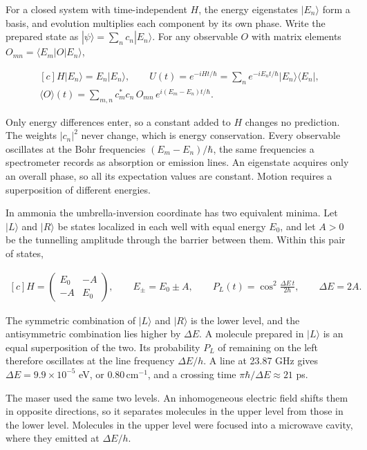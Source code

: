 \documentclass[11pt,oneside]{book}
\newenvironment{centeredalign}{\[\begin{gathered}[c]}{\end{gathered}\]}
\begin{document}
For a closed system with time-independent \(H\), the energy eigenstates \(|E_n\rangle\) form a basis, and evolution multiplies each component by its own phase. Write the prepared state as \(|\psi\rangle=\sum_nc_n|E_n\rangle\). For any observable \(O\) with matrix elements \(O_{mn}=\langle E_m|O|E_n\rangle\),

\begin{centeredalign}
H|E_n\rangle=E_n|E_n\rangle,\qquad
U(t)=e^{-iHt/\hbar}=\sum_ne^{-iE_nt/\hbar}|E_n\rangle\langle E_n|,\\
\langle O\rangle(t)=\sum_{m,n}c_m^*c_n\,O_{mn}\,e^{i(E_m-E_n)t/\hbar}.
\end{centeredalign}

Only energy differences enter, so a constant added to \(H\) changes no prediction. The weights \(|c_n|^2\) never change, which is energy conservation. Every observable oscillates at the Bohr frequencies \((E_m-E_n)/\hbar\), the same frequencies a spectrometer records as absorption or emission lines. An eigenstate acquires only an overall phase, so all its expectation values are constant. Motion requires a superposition of different energies.

In ammonia the umbrella-inversion coordinate has two equivalent minima. Let \(|L\rangle\) and \(|R\rangle\) be states localized in each well with equal energy \(E_0\), and let \(A>0\) be the tunnelling amplitude through the barrier between them. Within this pair of states,

\begin{centeredalign}
H=\begin{pmatrix}E_0&-A\\-A&E_0\end{pmatrix},\qquad E_\pm=E_0\pm A,\qquad
P_L(t)=\cos^2\frac{\Delta E\,t}{2\hbar},\qquad \Delta E=2A.
\end{centeredalign}

The symmetric combination of \(|L\rangle\) and \(|R\rangle\) is the lower level, and the antisymmetric combination lies higher by \(\Delta E\). A molecule prepared in \(|L\rangle\) is an equal superposition of the two. Its probability \(P_L\) of remaining on the left therefore oscillates at the line frequency \(\Delta E/h\). A line at 23.87 GHz gives \(\Delta E=9.9\times10^{-5}\) eV, or \(0.80\,\mathrm{cm}^{-1}\), and a crossing time \(\pi\hbar/\Delta E\approx21\) ps.

The maser used the same two levels. An inhomogeneous electric field shifts them in opposite directions, so it separates molecules in the upper level from those in the lower level. Molecules in the upper level were focused into a microwave cavity, where they emitted at \(\Delta E/h\).
\end{document}
